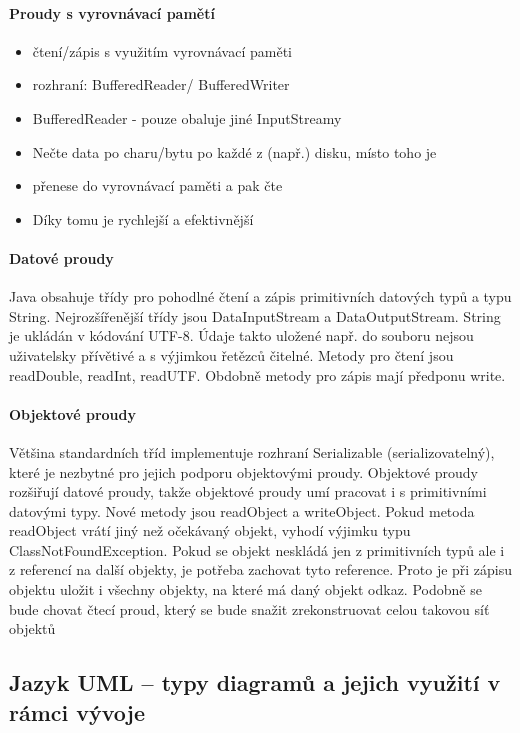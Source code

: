 \documentclass[10pt,a4paper]{article}
\begin{document}
\paragraph{Proudy s vyrovnávací pamětí}
\begin{itemize}
\item čtení/zápis s využitím vyrovnávací paměti
\item rozhraní:  BufferedReader/ BufferedWriter 
\item BufferedReader - pouze obaluje jiné InputStreamy
\item Nečte data po charu/bytu po každé z (např.) disku, místo toho je \item přenese do vyrovnávací paměti a pak čte
\item Díky tomu je rychlejší a efektivnější
\end{itemize}

\paragraph{Datové proudy}
Java obsahuje třídy pro pohodlné čtení a zápis primitivních datových typů a typu String. Nejrozšířenější třídy jsou DataInputStream a DataOutputStream. String je ukládán v kódování UTF-8. Údaje takto uložené např. do souboru nejsou uživatelsky přívětivé a s výjimkou řetězců čitelné. Metody pro čtení jsou readDouble, readInt, readUTF. Obdobně metody pro zápis mají předponu write.

\paragraph{Objektové proudy}
Většina standardních tříd implementuje rozhraní Serializable (serializovatelný), které je nezbytné pro jejich podporu objektovými proudy. Objektové proudy rozšiřují datové proudy, takže objektové proudy umí pracovat i s primitivními datovými typy. Nové metody jsou readObject a writeObject. Pokud metoda readObject vrátí jiný než očekávaný objekt, vyhodí výjimku typu ClassNotFoundException. Pokud se objekt neskládá jen z primitivních typů ale i z referencí na další objekty, je potřeba zachovat tyto reference. Proto je při zápisu objektu uložit i všechny objekty, na které má daný objekt odkaz. Podobně se bude chovat čtecí proud, který se bude snažit zrekonstruovat celou takovou síť objektů
\subsection{Jazyk UML – typy diagramů a jejich využití v rámci vývoje}
\end{document}
